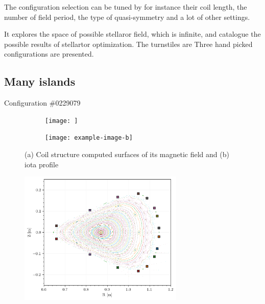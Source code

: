 The configuration selection can be tuned by for instance their coil length, the number of field period, the type of quasi-symmetry and a lot of other settings. 

It explores the space of possible stellaror field, which is infinite, and catalogue the possible results of stellartor optimization. The turnstiles are Three hand picked configurations are presented.


\subsection{Many islands}\label{sec:quars-0229079}
Configuration \#0229079

\begin{figure}[h!]
    \centering
    \begin{subfigure}[t]{0.49\textwidth}
        \centering
        \texttt{[image: ]}
        \caption{}
        \label{fig:}
    \end{subfigure}
    \hfill
    \begin{subfigure}[t]{0.49\textwidth}
        \centering
        \texttt{[image: example-image-b]}
        \caption{}
        \label{}
    \end{subfigure}
    \caption{(a) Coil structure computed surfaces of its magnetic field and (b) iota profile}
    \label{}
\end{figure}

\begin{subfigure}
    \centering
    \includegraphics[width=0.7\textwidth]{images/quasrs/fixedpoint_0229079_1.png}
    \caption{}
    \label{fig:0229079-p}
\end{subfigure}

